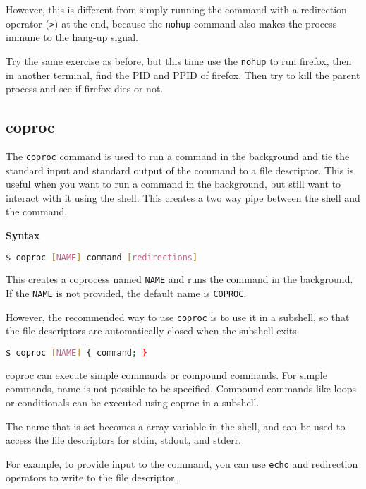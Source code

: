 However, this is different from simply running the command
with a redirection operator (\texttt{>}) at the end,
because the \texttt{nohup} command also makes the process
immune to the hang-up signal.

\begin{exercise}
  Try the same exercise as before, but this time use the \texttt{nohup}
  to run firefox, then in another terminal, find the PID and PPID of
  firefox. Then try to kill the parent process and see if firefox
  dies or not.
\end{exercise}

\subsection{coproc}

The \texttt{coproc} command is used to run a command in the background
and tie the standard input and standard output of the command to a
file descriptor. This is useful when you want to run a command in the
background, but still want to interact with it using the shell.
This creates a two way pipe between the shell and the command.

\textbf{Syntax}

\begin{lstlisting}[language=bash]
$ coproc [NAME] command [redirections]
\end{lstlisting}

This creates a coprocess named \texttt{NAME} and runs the command in the background.
If the \texttt{NAME} is not provided, the default name is \texttt{COPROC}.

However, the recommended way to use \texttt{coproc} is to use it in a
subshell, so that the file descriptors are automatically closed when
the subshell exits.

\begin{lstlisting}[language=bash]
$ coproc [NAME] { command; }
\end{lstlisting}

coproc can execute simple commands or compound commands. For simple
commands, name is not possible to be specified. Compound commands like
loops or conditionals can be executed using coproc in a subshell.

The name that is set becomes a array variable in the shell, and can be used
to access the file descriptors for stdin, stdout, and stderr.

For example, to provide input to the command, you can use \texttt{echo} and
redirection operators to write to the file descriptor.

